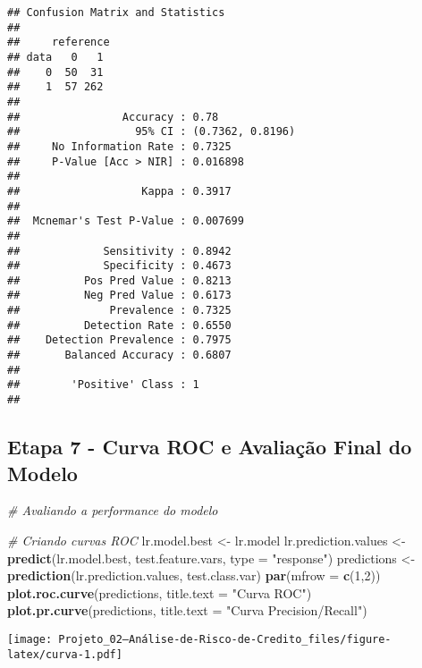 \documentclass[
]{article}
\newenvironment{Shaded}{\begin{snugshade}}{\end{snugshade}}
\newcommand{\CommentTok}[1]{\textcolor[rgb]{0.56,0.35,0.01}{\textit{#1}}}
\newcommand{\DataTypeTok}[1]{\textcolor[rgb]{0.13,0.29,0.53}{#1}}
\newcommand{\DecValTok}[1]{\textcolor[rgb]{0.00,0.00,0.81}{#1}}
\newcommand{\KeywordTok}[1]{\textcolor[rgb]{0.13,0.29,0.53}{\textbf{#1}}}
\newcommand{\NormalTok}[1]{#1}
\newcommand{\StringTok}[1]{\textcolor[rgb]{0.31,0.60,0.02}{#1}}
\begin{document}
\begin{verbatim}
## Confusion Matrix and Statistics
## 
##     reference
## data   0   1
##    0  50  31
##    1  57 262
##                                           
##                Accuracy : 0.78            
##                  95% CI : (0.7362, 0.8196)
##     No Information Rate : 0.7325          
##     P-Value [Acc > NIR] : 0.016898        
##                                           
##                   Kappa : 0.3917          
##                                           
##  Mcnemar's Test P-Value : 0.007699        
##                                           
##             Sensitivity : 0.8942          
##             Specificity : 0.4673          
##          Pos Pred Value : 0.8213          
##          Neg Pred Value : 0.6173          
##              Prevalence : 0.7325          
##          Detection Rate : 0.6550          
##    Detection Prevalence : 0.7975          
##       Balanced Accuracy : 0.6807          
##                                           
##        'Positive' Class : 1               
## 
\end{verbatim}

\hypertarget{etapa-7---curva-roc-e-avaliauxe7uxe3o-final-do-modelo}{%
\subsection{Etapa 7 - Curva ROC e Avaliação Final do
Modelo}\label{etapa-7---curva-roc-e-avaliauxe7uxe3o-final-do-modelo}}

\begin{Shaded}
\begin{Highlighting}[]
\CommentTok{# Avaliando a performance do modelo}

\CommentTok{# Criando curvas ROC}
\NormalTok{lr.model.best <-}\StringTok{ }\NormalTok{lr.model}
\NormalTok{lr.prediction.values <-}\StringTok{ }\KeywordTok{predict}\NormalTok{(lr.model.best, test.feature.vars, }\DataTypeTok{type =} \StringTok{"response"}\NormalTok{)}
\NormalTok{predictions <-}\StringTok{ }\KeywordTok{prediction}\NormalTok{(lr.prediction.values, test.class.var)}
\KeywordTok{par}\NormalTok{(}\DataTypeTok{mfrow =} \KeywordTok{c}\NormalTok{(}\DecValTok{1}\NormalTok{,}\DecValTok{2}\NormalTok{))}
\KeywordTok{plot.roc.curve}\NormalTok{(predictions, }\DataTypeTok{title.text =} \StringTok{"Curva ROC"}\NormalTok{)}
\KeywordTok{plot.pr.curve}\NormalTok{(predictions, }\DataTypeTok{title.text =} \StringTok{"Curva Precision/Recall"}\NormalTok{)}
\end{Highlighting}
\end{Shaded}

\texttt{[image: Projeto\_02---Análise-de-Risco-de-Credito\_files/figure-latex/curva-1.pdf]}
\end{document}
